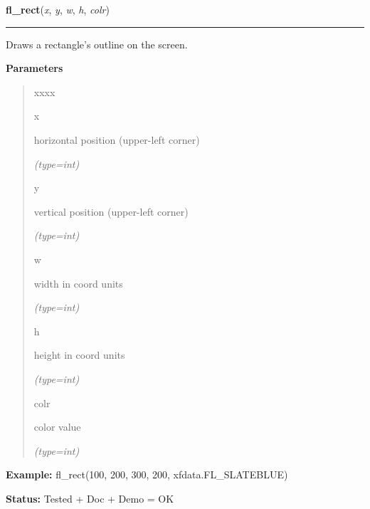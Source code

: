     \label{xformslib:flxbasic:fl_rect}

    \vspace{0.5ex}

\hspace{.8\funcindent}\begin{boxedminipage}{\funcwidth}

    \raggedright \textbf{fl\_rect}(\textit{x}, \textit{y}, \textit{w}, \textit{h}, \textit{colr})

    \vspace{-1.5ex}

    \rule{\textwidth}{0.5\fboxrule}
\setlength{\parskip}{2ex}
    Draws a rectangle's outline on the screen.

\setlength{\parskip}{1ex}
      \textbf{Parameters}
      \vspace{-1ex}

      \begin{quote}
        \begin{Ventry}{xxxx}

          \item[x]

          horizontal position (upper-left corner)

            {\it (type=int)}

          \item[y]

          vertical position (upper-left corner)

            {\it (type=int)}

          \item[w]

          width in coord units

            {\it (type=int)}

          \item[h]

          height in coord units

            {\it (type=int)}

          \item[colr]

          color value

            {\it (type=int)}

        \end{Ventry}

      \end{quote}

\textbf{Example:} fl\_rect(100, 200, 300, 200, xfdata.FL\_SLATEBLUE)



\textbf{Status:} Tested + Doc + Demo = OK



    \end{boxedminipage}

